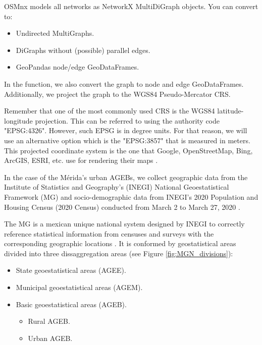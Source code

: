 OSMnx models all networks as NetworkX MultiDiGraph objects. You can convert to:

\begin{itemize}
	\item Undirected MultiGraphs.
	\item DiGraphs without (possible) parallel edges.
	\item GeoPandas node/edge GeoDataFrames.
\end{itemize}

In the function, we also convert the graph to node and edge GeoDataFrames. Additionally, we project the graph to the WGS84 Pseudo-Mercator  CRS.

Remember that one of the most commonly used CRS is the WGS84 latitude-longitude projection. This can be referred to using the authority code "EPSG:4326". However, such EPSG is in degree units. For that reason, we will use an alternative option which is the "EPSG:3857" that is measured in meters. This projected coordinate system is the one that Google, OpenStreetMap, Bing, ArcGIS, ESRI, etc. use for rendering their maps \cite{epsg3857}.

In the case of the Mérida's urban AGEBs, we collect geographic data from the Institute of Statistics and Geography's (INEGI) National Geoestatistical Framework (MG) and socio-demographic data from INEGI's 2020 Population and Housing Census (2020 Census) conducted from March 2 to March 27, 2020 \cite{2020census}.

The MG is a mexican unique national system designed by INEGI to correctly reference statistical information from censuses and surveys with the corresponding geographic locations \cite{manualMGN}. It is conformed by geostatistical areas divided into three dissaggregation areas (see Figure \ref{fig:MGN_divisions}):

\begin{itemize}
	\item State geoestatistical areas (AGEE).
	\item Municipal geoestatistical areas (AGEM).
	\item Basic geoestatistical areas (AGEB).
	\begin{itemize}
		\item Rural AGEB.
		\item Urban AGEB.
	\end{itemize}
\end{itemize}

